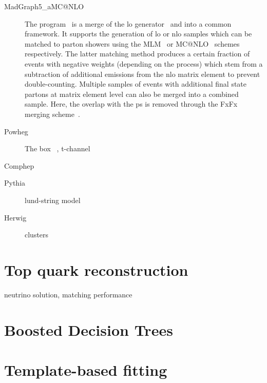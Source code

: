 \begin{description}
\item[MadGraph5\_aMC{@}NLO] The \MGAMC program~\cite{Alwall:2014hca} is a merge of the \gls{lo} \MG generator~\cite{Alwall:2011uj} and \AMC into a common framework. It supports the generation of \gls{lo} or \gls{nlo} samples which can be matched to parton showers using the MLM~\cite{Mangano:2006rw} or MC{@}NLO~\cite{Frixione:2002ik} schemes respectively. The latter matching method produces a certain fraction of events with negative weights (depending on the process) which stem from a subtraction of additional emissions from the \gls{nlo} matrix element to prevent double-counting. 
Multiple samples of events with additional final state partons at matrix element level can also be merged into a combined sample. Here, the overlap with the \gls{ps} is removed through the FxFx merging scheme~\cite{Frederix:2012ps}.

\item[Powheg] The \POWHEG box~\cite{Alioli:2010xd}
, t-channel~\cite{Alioli:2009je}

\item[Comphep]
\cite{Boos:2004kh}

\item[Pythia] lund-string model
\cite{Sjostrand:2006za,Sjostrand:2014zea}

\item[Herwig] clusters
\cite{Bellm:2015jjp}

\end{description}


\section{Top quark reconstruction}

neutrino solution, matching performance

\section{Boosted Decision Trees}
\cite{Hocker:2007ht}

\section{Template-based fitting}

